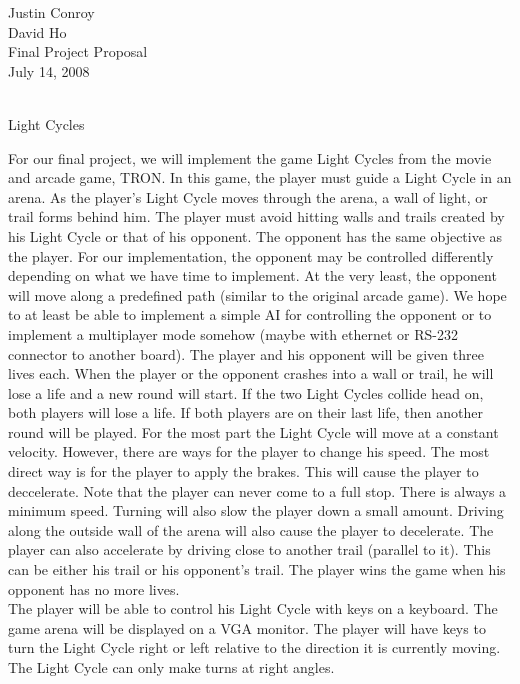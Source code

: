 \documentclass[12pt,letterpaper] {article}
\begin{document}
\noindent Justin Conroy\\
David Ho\\
Final Project Proposal\\
July 14, 2008\\
\\

\begin{center} \LARGE{Light Cycles}\\ \end{center}

\indent For our final project, we will implement the game Light Cycles from the movie and arcade game, TRON. In this game, the player must guide a Light Cycle in an arena. As the player's Light Cycle moves through the arena, a wall of light, or trail forms behind him. The player must avoid hitting walls and trails created by his Light Cycle or that of his opponent. The opponent has the same objective as the player. For our implementation, the opponent may be controlled differently depending on what we have time to implement. At the very least, the opponent will move along a predefined path (similar to the original arcade game). We hope to at least be able to implement a simple AI for controlling the opponent or to implement a multiplayer mode somehow (maybe with ethernet or RS-232 connector to another board). The player and his opponent will be given three lives each. When the player or the opponent crashes into a wall or trail, he will lose a life and a new round will start. If the two Light Cycles collide head on, both players will lose a life. If both players are on their last life, then another round will be played. For the most part the Light Cycle will move at a constant velocity. However, there are ways for the player to change his speed. The most direct way is for the player to apply the brakes. This will cause the player to deccelerate. Note that the player can never come to a full stop. There is always a minimum speed. Turning will also slow the player down a small amount. Driving along the outside wall of the arena will also cause the player to decelerate. The player can also accelerate by driving close to another trail (parallel to it). This can be either his trail or his opponent's trail. The player wins the game when his opponent has no more lives.\\
\indent The player will be able to control his Light Cycle with keys on a keyboard. The game arena will be displayed on a VGA monitor. The player will have keys to turn the Light Cycle right or left relative to the direction it is currently moving. The Light Cycle can only make turns at right angles.\\
\end{document}
